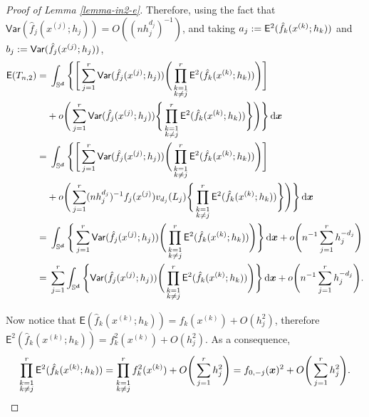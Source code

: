 \documentclass[oneside,11pt]{article}
\begin{document}
\begin{proof}[Proof of Lemma \ref{lemma-in2-e}]
Therefore, using the fact that $\mathsf{Var} (\hat{f}_j(x^{(j)};h_j)) = O((n h_j^{d_j})^{-1})$, and taking $a_j := \mathsf{E}^2 (\hat{f}_k(x^{(k)};h_k))$ and $b_j := \mathsf{Var} (\hat{f}_j(x^{(j)};h_j))$,
\begin{align*}
     \mathsf{E} (T_{n,2}) =&\; \int_{\mathbb{S}^{\boldsymbol{d}}} \Bigg\{ \Bigg[ \sum_{j=1}^{r} \mathsf{Var} (\hat{f}_j(x^{(j)};h_j)) \Bigg( \prod_{\substack{k=1\\k\neq j}}^r \mathsf{E}^2 (\hat{f}_k(x^{(k)};h_k)) \Bigg) \Bigg] \\
     & + o \Bigg( \sum_{j=1}^{r} \mathsf{Var} (\hat{f}_j(x^{(j)};h_j)) \Bigg\{ \prod_{\substack{k=1\\k\neq j}}^r \mathsf{E}^2 (\hat{f}_k(x^{(k)};h_k)) \Bigg\} \Bigg) \Bigg\} \,\mathrm{d} \boldsymbol{x} \\
     =&\; \int_{\mathbb{S}^{\boldsymbol{d}}} \Bigg\{ \Bigg[ \sum_{j=1}^{r} \mathsf{Var} (\hat{f}_j(x^{(j)};h_j)) \Bigg( \prod_{\substack{k=1\\k\neq j}}^r \mathsf{E}^2 (\hat{f}_k(x^{(k)};h_k)) \Bigg) \Bigg] \\
     &+ o \Bigg( \sum_{j=1}^{r} (n h_j^{d_j})^{-1} f_j(x^{(j)}) v_{d_j}(L_j) \Bigg\{ \prod_{\substack{k=1\\k\neq j}}^r \mathsf{E}^2 (\hat{f}_k(x^{(k)};h_k)) \Bigg\}  \Bigg) \Bigg\} \,\mathrm{d} \boldsymbol{x} \\
     =&\; \int_{\mathbb{S}^{\boldsymbol{d}}} \Bigg\{ \sum_{j=1}^{r} \mathsf{Var} (\hat{f}_j(x^{(j)};h_j)) \Bigg( \prod_{\substack{k=1\\k\neq j}}^r \mathsf{E}^2 (\hat{f}_k(x^{(k)};h_k)) \Bigg) \Bigg\} \,\mathrm{d} \boldsymbol{x} + o \Bigg( n^{-1} \sum_{j=1}^{r} h_j^{-d_j} \Bigg) \\
     =&\; \sum_{j=1}^{r} \int_{\mathbb{S}^{\boldsymbol{d}}} \Bigg\{ \mathsf{Var} (\hat{f}_j(x^{(j)};h_j)) \Bigg( \prod_{\substack{k=1\\k\neq j}}^r \mathsf{E}^2 (\hat{f}_k(x^{(k)};h_k)) \Bigg) \Bigg\} \,\mathrm{d} \boldsymbol{x} + o \Bigg( n^{-1} \sum_{j=1}^{r} h_j^{-d_j} \Bigg).
\end{align*}

Now notice that $\mathsf{E} (\hat{f}_k(x^{(k)};h_k)) = f_k(x^{(k)}) + O(h_j^2)$, therefore $\mathsf{E}^2 (\hat{f}_k(x^{(k)};h_k)) = f_k^2(x^{(k)}) + O(h_j^2)$. As a consequence,
\begin{align*}
    \prod_{\substack{k=1\\k\neq j}}^r \mathsf{E}^2 (\hat{f}_k(x^{(k)};h_k)) = \prod_{\substack{k=1\\k\neq j}}^r f_k^2(x^{(k)}) + O \Bigg( \sum_{j=1}^{r} h_j^2 \Bigg)= f_{0,-j}(\boldsymbol{x})^2+ O \Bigg( \sum_{j=1}^{r} h_j^2 \Bigg).
\end{align*}


\end{proof}
\end{document}

